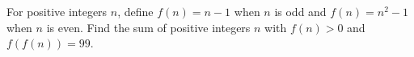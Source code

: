 For positive integers $n$, define $f(n)=n-1$ when $n$ is odd and $f(n)=n^2-1$ when $n$ is even. Find the sum of positive integers $n$ with $f(n)>0$ and $f(f(n))=99$.
